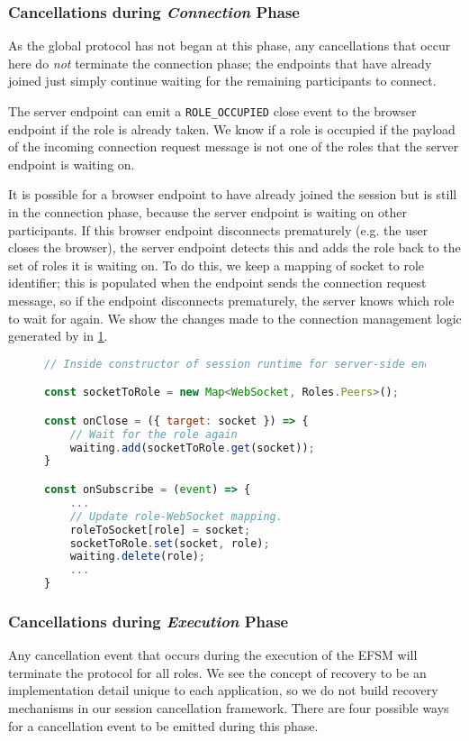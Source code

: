 \subsubsection{Cancellations during \textit{Connection} Phase}
As the global protocol has not began at this phase,
any cancellations that occur here do \textit{not} terminate
the connection phase; the endpoints that have already
joined just simply continue waiting for the remaining participants
to connect.

The server endpoint can emit a \texttt{ROLE_OCCUPIED} close event
to the browser endpoint if the role is already taken.
We know if a role is occupied if the payload of the
incoming connection request message is not one of the roles
that the server endpoint is waiting on.

It is possible for a browser endpoint to have already joined
the session but is still in the connection phase, because the
server endpoint is waiting on other participants. If this browser
endpoint disconnects prematurely (e.g. the user closes
the browser), the server endpoint detects this and adds the role
back to the set of roles it is waiting on. To do this, we keep
a mapping of socket to role identifier; this is populated
when the endpoint sends the connection request message,
so if the endpoint disconnects prematurely, the server knows
which role to wait for again. We show the changes made to 
the connection management logic generated by 
in \cref{lst:cancelconnectsvr}.

\begin{figure}[!h]
\begin{lstlisting}[language=javascript]
// Inside constructor of session runtime for server-side endpoint

const socketToRole = new Map<WebSocket, Roles.Peers>();

const onClose = ({ target: socket }) => {
	// Wait for the role again
	waiting.add(socketToRole.get(socket));
}

const onSubscribe = (event) => {
	...
	// Update role-WebSocket mapping.
	roleToSocket[role] = socket;
	socketToRole.set(socket, role);
	waiting.delete(role);
	...
}
\end{lstlisting}
\label{lst:cancelconnectsvr}
\end{figure}


\subsubsection{Cancellations during \textit{Execution} Phase}
Any cancellation event that occurs during the execution of the
EFSM will terminate the protocol for all roles.
We see the concept of recovery to be an implementation detail
unique to each application, so we do not build recovery
mechanisms in our session cancellation framework.
There are four possible ways for a cancellation event
to be emitted during this phase.

